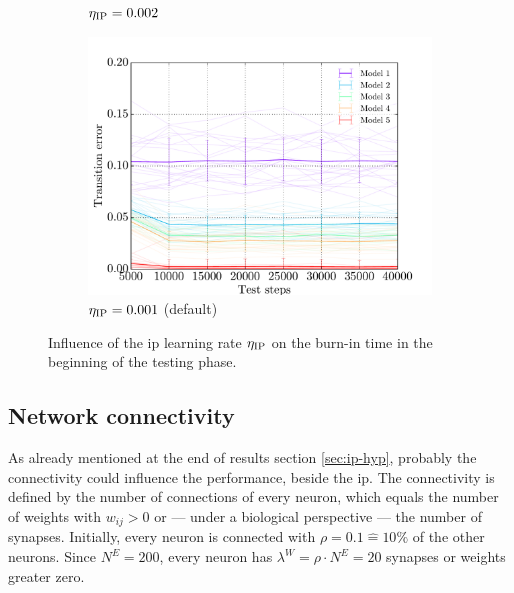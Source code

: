 \begin{figure}[!b]
\begin{subfigure}{0.48\textwidth}
        \caption{$\eta_{\text{IP}} = 0.002$}
        \label{fig:eta-huge}
    \end{subfigure}
    \begin{subfigure}{0.48\textwidth}
    	\centering
        \includegraphics[width=\textwidth]{appendix/etaip_test_traces_distances}
        \caption{$\eta_{\text{IP}} = 0.001$ (default)}
        \label{fig:eta-norm}
    \end{subfigure}
    \caption[Influence of the IP learning rate]{Influence of the \acs{ip} learning rate $\eta_{\text{IP}}$ on the burn-in time in the beginning of the testing phase.}
    \label{fig:eta-ip}
\end{figure}

\clearpage

\subsection{Network connectivity}
\label{sec:appendix:connectivity}

As already mentioned at the end of results section \ref{sec:ip-hyp}, probably the connectivity could influence the performance, beside the \acl{ip}. The connectivity is defined by the number of connections of every neuron, which equals the number of weights with $w_{ij} > 0$ or --- under a biological perspective --- the number of synapses. Initially, every neuron is connected with $\rho = 0.1 \hat{=} 10\%$ of the other neurons. Since $N^E = 200$, every neuron has $\lambda^W = \rho \cdot N^E = 20$ synapses or weights greater zero. 

